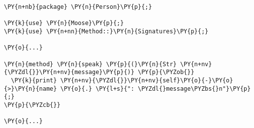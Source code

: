 \begin{Verbatim}[commandchars=\\\{\}]
\PY{n+nb}{package} \PY{n}{Person}\PY{p}{;}

\PY{k}{use} \PY{n}{Moose}\PY{p}{;}
\PY{k}{use} \PY{n+nn}{Method::}\PY{n}{Signatures}\PY{p}{;}

\PY{o}{...}

\PY{n}{method} \PY{n}{speak} \PY{p}{(}\PY{n}{Str} \PY{n+nv}{\PYZdl{}}\PY{n+nv}{message}\PY{p}{)} \PY{p}{\PYZob{}}
  \PY{k}{print} \PY{n+nv}{\PYZdl{}}\PY{n+nv}{self}\PY{o}{-}\PY{o}{>}\PY{n}{name} \PY{o}{.} \PY{l+s}{": \PYZdl{}message\PYZbs{}n"}\PY{p}{;}
\PY{p}{\PYZcb{}}

\PY{o}{...}
\end{Verbatim}
